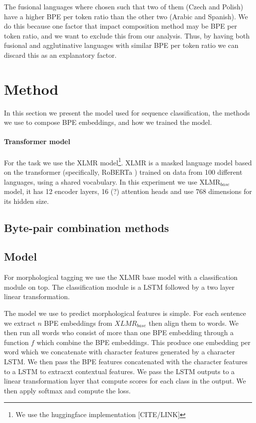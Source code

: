 \documentclass[11pt]{article}
\begin{document}
    The fusional languages where chosen such that two of them (Czech and Polish) have a higher BPE per token ratio than the other two (Arabic and Spanish). We do this because one factor that impact composition method may be BPE per token ratio, and we want to exclude this from our analysis. Thus, by having both fusional and agglutinative languages with similar BPE per token ratio we can discard this as an explanatory factor. 
    

	
	\section{Method}
	\label{method}
	
	In this section we present the model used for sequence classification, the methods we use to compose BPE embeddings, and how we trained the model.
	
	
	\paragraph{Transformer model}
	For the task we use the XLMR \citep{conneau2019unsupervised} model\footnote{We use the huggingface implementation [CITE/LINK]}. XLMR is a masked language model based on the transformer (specifically, RoBERTa \citep{liu2019roberta}) trained on data from 100 different languages, using a shared vocabulary. In this experiment we use \textsc{XLMR}$_{base}$ model, it has 12 encoder layers, 16 (?) attention heads and use 768 dimensions for its hidden size. 
	
	\subsection{Byte-pair combination methods}
	


	
	\subsection{Model}
	For morphological tagging we use the XLMR base model with a classification module on top. The classification module is a LSTM followed by a two layer linear transformation. 
	
	The model we use to predict morphological features is simple. For each sentence we extract $n$ BPE embeddings from $XLMR_{base}$ then align them to words. 
	We then run all words who consist of more than one BPE embedding through a function $f$ which combine the BPE embeddings. This produce one embedding per word which we concatenate with character features generated by a character LSTM. We then pass the BPE features concatenated with the character features to a LSTM to extracxt contextual features.
	We pass the LSTM outputs to a linear transformation layer that compute scores for each class in the output. We then apply softmax and compute the loss.
	
\end{document}
